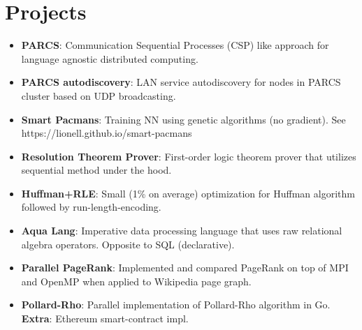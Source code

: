 \documentclass[letterpaper,11pt]{article}
\newcommand{\resumeSubItem}[2]{
  \item\small{
    \textbf{#1}{: #2 \vspace{-2pt}}
  }
}
\newcommand{\resumeSubHeadingListStart}{\begin{itemize}[leftmargin=*]}
\newcommand{\resumeSubHeadingListEnd}{\end{itemize}}
\begin{document}
\section{Projects}
  \resumeSubHeadingListStart
    \resumeSubItem{PARCS}
      {Communication Sequential Processes (CSP) like approach for language agnostic distributed computing.}
    \resumeSubItem{PARCS autodiscovery}
      {LAN service autodiscovery for nodes in PARCS cluster based on UDP broadcasting.}
    \resumeSubItem{Smart Pacmans}
      {Training NN using genetic algorithms (no gradient). See https://lionell.github.io/smart-pacmans}
    \resumeSubItem{Resolution Theorem Prover}
      {First-order logic theorem prover that utilizes sequential method under the hood.}
    \resumeSubItem{Huffman+RLE}
      {Small (1\% on average) optimization for Huffman algorithm followed by run-length-encoding.}
    \resumeSubItem{Aqua Lang}
      {Imperative data processing language that uses raw relational algebra operators. Opposite to SQL (declarative).}
    \resumeSubItem{Parallel PageRank}
      {Implemented and compared PageRank on top of MPI and OpenMP when applied to Wikipedia page graph.}
    \resumeSubItem{Pollard-Rho}
      {Parallel implementation of Pollard-Rho algorithm in Go. \textbf{Extra}: Ethereum smart-contract impl.}
  \resumeSubHeadingListEnd


%


\end{document}
